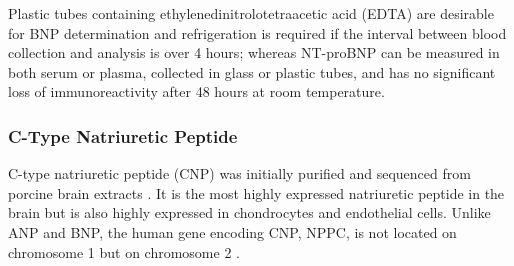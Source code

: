 \documentclass[14pt,a4paper,onecolumn]{extarticle}
\begin{document}
Plastic tubes containing ethylenedinitrolotetraacetic acid (EDTA) are desirable for BNP determination and refrigeration is required if the interval between blood collection and analysis is over 4 hours; whereas NT-proBNP can be measured in both serum or plasma, collected in glass or plastic tubes, and has no significant loss of immunoreactivity after 48 hours at room temperature. \citep{Omland2008}


\subsubsection{C-Type Natriuretic Peptide}
C-type natriuretic peptide (CNP) was initially purified and sequenced from porcine brain extracts \citep{Sudoh1990}. It is the most highly expressed natriuretic peptide in the brain but is also highly expressed in chondrocytes and endothelial cells. Unlike ANP and BNP, the human gene encoding CNP, NPPC, is not located on chromosome 1 but on chromosome 2 \citep{Ogawa1994b}.

\end{document}

